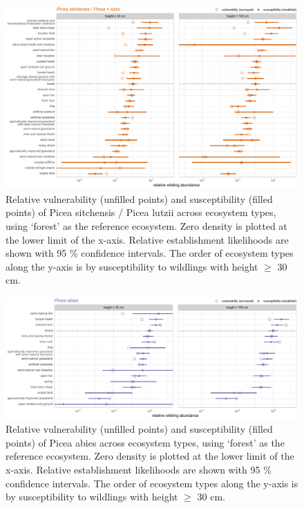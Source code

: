 \documentclass[
]{article}
\begin{document}
\begin{figure}
\centering
\includegraphics{figures/susceptibility/Ps.pdf}
\caption{\label{fig:susceptibility-Ps}Relative vulnerability (unfilled points) and susceptibility (filled points) of Picea sitchensis / Picea \times lutzii across ecosystem types, using `forest' as the reference ecosystem. Zero density is plotted at the lower limit of the x-axis. Relative establishment likelihoods are shown with 95 \% confidence intervals. The order of ecosystem types along the y-axis is by susceptibility to wildlings with height \(\geq\) 30 cm.}
\end{figure}

\begin{figure}
\centering
\includegraphics{figures/susceptibility/Pa.pdf}
\caption{\label{fig:susceptibility-Pa}Relative vulnerability (unfilled points) and susceptibility (filled points) of Picea abies across ecosystem types, using `forest' as the reference ecosystem. Zero density is plotted at the lower limit of the x-axis. Relative establishment likelihoods are shown with 95 \% confidence intervals. The order of ecosystem types along the y-axis is by susceptibility to wildlings with height \(\geq\) 30 cm.}
\end{figure}
\end{document}
